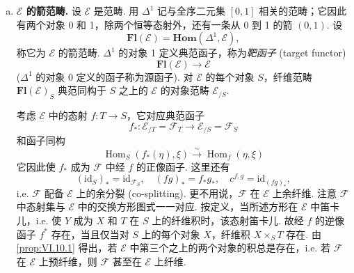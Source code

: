 \begin{enumerate}[a)]
\item \textbf{$\mathcal{E}$ 的箭范畴.} 设 $\mathcal{E}$ 是范畴. 用 $\Delta^{1}$ 记与全序二元集 $[0, 1]$ 相关的范畴；它因此有两个对象 0 和 1，除两个恒等态射外，还有一条从 0 到 1 的箭 $(0, 1)$. 设
\[
\mathbf{Fl}(\mathcal{E}) = \mathbf{Hom}(\Delta^{1}, \mathcal{E}),
\]
称它为 $\mathcal{E}$ 的箭范畴. $\Delta^{1}$ 的对象 1 定义典范函子，称为\emph{靶函子} (target functor)
\[
\mathbf{Fl}(\mathcal{E}) \longrightarrow \mathcal{E}
\]
($\Delta^{1}$ 的对象 0 定义的函子称为源函子). 对 $\mathcal{E}$ 的每个对象 $S$，纤维范畴 $\mathbf{Fl}(\mathcal{E})_S$ 典范同构于 $S$ 之上的 $\mathcal{E}$ 的对象范畴 $\mathcal{E}_{/S}$.

考虑 $\mathcal{E}$ 中的态射 $f \colon T \to S$，它对应典范函子
\[
f_{*} \colon \mathcal{E}_{/T} = \mathcal{F}_T \longrightarrow \mathcal{E}_{/S} = \mathcal{F}_S
\]
和函子同构
\[
\operatorname{Hom}_S(f_{*}(\eta), \xi) \xrightarrow{\sim} \operatorname{Hom}_f(\eta, \xi)
\]
它因此使 $f_{*}$ 成为 $\mathcal{F}$ 中经 $f$ 的正像函子. 这里还有
\[
(\mathrm{id}_S)_{*} = \mathrm{id}_{\mathcal{F}_S}, \quad (fg)_{*} = f_{*} g_{*}, \quad c^{f,g} = \mathrm{id}_{(fg)_{*}},
\]
i.e. $\mathcal{F}$ 配备 $\mathcal{E}$ 上的余分裂 (co-splitting). 更不用说，$\mathcal{F}$ 在 $\mathcal{E}$ 上余纤维. 注意 $\mathcal{F}$ 中态射集与 $\mathcal{E}$ 中的交换方形图式一一对应. 按定义，当所述方形在 $\mathcal{E}$ 中笛卡儿，i.e. 使 $Y$ 成为 $X$ 和 $T$ 在 $S$ 上的纤维积时，该态射笛卡儿. 故经 $f$ 的逆像函子 $f^{*}$ 存在，当且仅当对 $S$ 上的每个对象 $X$，纤维积 $X \times_S T$ 存在. 由 \ref{prop:VI.10.1} 得出，若 $\mathcal{E}$ 中第三个之上的两个对象的积总是存在，i.e. 若 $\mathcal{F}$ 在 $\mathcal{E}$ 上预纤维，则 $\mathcal{F}$ 甚至在 $\mathcal{E}$ 上纤维.


\end{enumerate}
